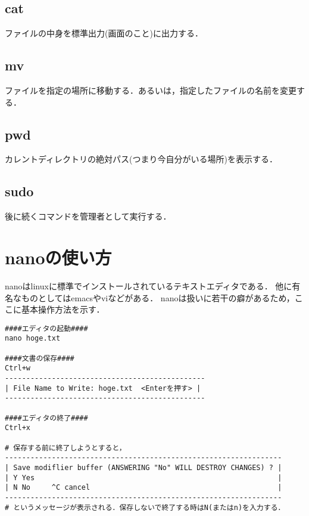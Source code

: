 \documentclass[10pt,a4paper]{jarticle}
\begin{document}
\subsection{cat}
ファイルの中身を標準出力(画面のこと)に出力する．

\subsection{mv}
ファイルを指定の場所に移動する．あるいは，指定したファイルの名前を変更する．

\subsection{pwd}
カレントディレクトリの絶対パス(つまり今自分がいる場所)を表示する．

\subsection{sudo}
後に続くコマンドを管理者として実行する．


\section{nanoの使い方}
nanoはlinuxに標準でインストールされているテキストエディタである．
他に有名なものとしてはemacsやviなどがある．
nanoは扱いに若干の癖があるため，ここに基本操作方法を示す．

\begin{shadebox}
\begin{verbatim}
####エディタの起動####
nano hoge.txt

####文書の保存####
Ctrl+w
-----------------------------------------------
| File Name to Write: hoge.txt  <Enterを押す> |
-----------------------------------------------

####エディタの終了####
Ctrl+x

# 保存する前に終了しようとすると，
-----------------------------------------------------------------
| Save modiflier buffer (ANSWERING "No" WILL DESTROY CHANGES) ? |
| Y Yes                                                         |
| N No     ^C cancel                                            |
-----------------------------------------------------------------
# というメッセージが表示される．保存しないで終了する時はN(またはn)を入力する．

\end{verbatim}
\end{shadebox}
\vspace{4mm}

\newpage


%

\end{document}
